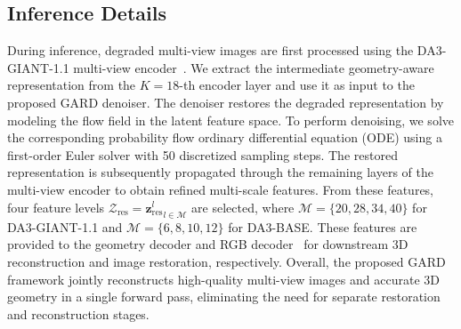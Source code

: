 \subsection{Inference Details}
During inference, degraded multi-view images are first processed using the DA3-GIANT-1.1 multi-view encoder~\cite{depthanything3}. We extract the intermediate geometry-aware representation from the $K=18$-th encoder layer and use it as input to the proposed GARD denoiser. The denoiser restores the degraded representation by modeling the flow field in the latent feature space. To perform denoising, we solve the corresponding probability flow ordinary differential equation (ODE) using a first-order Euler solver with 50 discretized sampling steps. The restored representation is subsequently propagated through the remaining layers of the multi-view encoder to obtain refined multi-scale features. From these features, four feature levels $\mathcal{Z}_{\text{res}} = {\mathbf{z}_{\text{res}}^{l}}_{l \in \mathcal{M}}$ are selected, where $\mathcal{M}=\{20, 28, 34, 40\}$ for DA3-GIANT-1.1 and $\mathcal{M}=\{6, 8, 10, 12\}$ for DA3-BASE. These features are provided to the geometry decoder and RGB decoder~\cite{jang2026gld} for downstream 3D reconstruction and image restoration, respectively. Overall, the proposed GARD framework jointly reconstructs high-quality multi-view images and accurate 3D geometry in a single forward pass, eliminating the need for separate restoration and reconstruction stages.

        